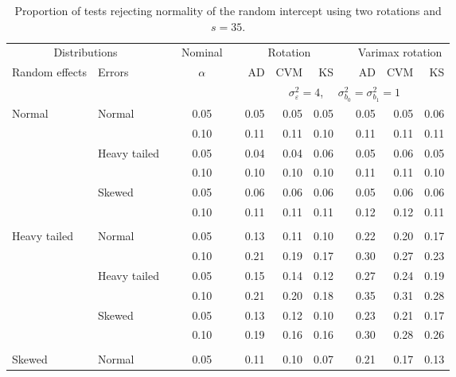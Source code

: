 \begin{table}[ht]
\centering
\caption{\label{tab:simb035}Proportion of tests rejecting normality of the random intercept using two rotations and $s = 35$.}
\begin{scriptsize}
\begin{tabular}{ll p{.1cm} c p{.1cm} rrr p{.1cm} rrr}
  \hline
  \multicolumn{2}{c}{Distributions}& & Nominal & &  \multicolumn{3}{c}{Rotation} & & \multicolumn{3}{c}{Varimax rotation} \\ \cline{1-2} \cline{6-8} \cline{10-12}   
  Random effects & Errors & & $\alpha$ & & AD & CVM & KS & & AD & CVM & KS \\ 
   \hline
& && && \multicolumn{7}{c}{$\sigma_{\varepsilon}^2 = 4$, \ \ $\sigma_{b_0}^2 = \sigma_{b_1}^2 = 1$} \\ \cline{6-12}
\rowcolor{gray!20}Normal       & Normal       && 0.05 &&  0.05 & 0.05 & 0.05 && 0.05 & 0.05 & 0.06 \\ 
\rowcolor{gray!20}             &              && 0.10 &&  0.11 & 0.11 & 0.10 && 0.11 & 0.11 & 0.11 \\ 
\rowcolor{gray!20}             & Heavy tailed && 0.05 &&  0.04 & 0.04 & 0.06 && 0.05 & 0.06 & 0.05 \\ 
\rowcolor{gray!20}             &              && 0.10 &&  0.10 & 0.10 & 0.10 && 0.11 & 0.11 & 0.10 \\ 
\rowcolor{gray!20}             & Skewed       && 0.05 &&  0.06 & 0.06 & 0.06 && 0.05 & 0.06 & 0.06 \\ 
\rowcolor{gray!20}             &              && 0.10 &&  0.11 & 0.11 & 0.11 && 0.12 & 0.12 & 0.11 \\ 
             &&&&&&&&&&&\\
Heavy tailed & Normal       && 0.05 &&  0.13 & 0.11 & 0.10 && 0.22 & 0.20 & 0.17 \\ 
             &              && 0.10 &&  0.21 & 0.19 & 0.17 && 0.30 & 0.27 & 0.23 \\ 
             & Heavy tailed && 0.05 &&  0.15 & 0.14 & 0.12 && 0.27 & 0.24 & 0.19 \\ 
             &              && 0.10 &&  0.21 & 0.20 & 0.18 && 0.35 & 0.31 & 0.28 \\ 
             & Skewed       && 0.05 &&  0.13 & 0.12 & 0.10 && 0.23 & 0.21 & 0.17 \\ 
             &              && 0.10 &&  0.19 & 0.16 & 0.16 && 0.30 & 0.28 & 0.26 \\ 
             &&&&&&&&&&&\\
Skewed       & Normal       && 0.05 &&  0.11 & 0.10 & 0.07 && 0.21 & 0.17 & 0.13 \\ 

\end{tabular}
\end{scriptsize}
\end{table}
